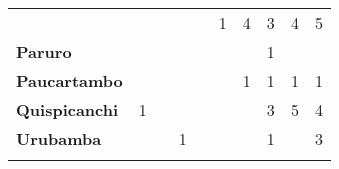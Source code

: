 \begin{tabular}{lccccccccc}
	&\cellcolor[HTML]{FCC46C} 			
	&\cellcolor[HTML]{FCC46C}					&\cellcolor[HTML]{FCC46C}  					&\cellcolor[HTML]{FCC46C} 		            &1 					
	&4 											&3
	&4											&5\\
	\textbf{Paruro}                            
	&\cellcolor[HTML]{FCC46C}        			&\cellcolor[HTML]{FCC46C}                   &\cellcolor[HTML]{FCC46C}   				&\cellcolor[HTML]{FCC46C} 					&\cellcolor[HTML]{FCC46C}		 			&\cellcolor[HTML]{FCC46C}					
	&1
	&\cellcolor[HTML]{FCC46C}					&\cellcolor[HTML]{FCC46C}\\
	\textbf{Paucartambo}               		                       
	&\cellcolor[HTML]{FCC46C}					&\cellcolor[HTML]{FCC46C}					
	&\cellcolor[HTML]{FCC46C}					&\cellcolor[HTML]{FCC46C}                   &\cellcolor[HTML]{FCC46C} 					&1
	&1											&1		
	&1\\
	\textbf{Quispicanchi}                                         	                  			
	&1
	&\cellcolor[HTML]{FCC46C}					&\cellcolor[HTML]{FCC46C}					&\cellcolor[HTML]{FCC46C} 
	&\cellcolor[HTML]{FCC46C}					&\cellcolor[HTML]{FCC46C}
	&3											&5
	&4\\
	\textbf{Urubamba}                                                          
	&\cellcolor[HTML]{FCC46C}		
	&\cellcolor[HTML]{FCC46C}					&1
	&\cellcolor[HTML]{FCC46C}					&\cellcolor[HTML]{FCC46C}
	&\cellcolor[HTML]{FCC46C}					&1
	&\cellcolor[HTML]{FCC46C}					&3\\
	
	&\multicolumn{1}{l}{}                       &\multicolumn{1}{l}{}            &\multicolumn{1}{l}{}                         
	&\multicolumn{1}{l}{}                       &\multicolumn{1}{l}{}            &\multicolumn{1}{l}{}                       &\multicolumn{1}{l}{}                       &\multicolumn{1}{l}{}            &\multicolumn{1}{l}{}    
\end{tabular}